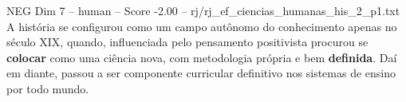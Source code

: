 \begin{textsample}{NEG Dim 7 – human – Score -2.00 – rj/rj\_ef\_ciencias\_humanas\_his\_2\_p1.txt}  \label{ex:f7_neg_012}
A história se configurou como um campo autônomo do conhecimento apenas no século XIX, quando, influenciada pelo pensamento positivista procurou se \textbf{colocar} como uma ciência nova, com metodologia própria e bem \textbf{definida}.
Daí em diante, passou a ser componente curricular definitivo nos sistemas de ensino por todo mundo.

\end{textsample}
